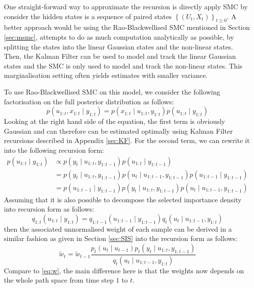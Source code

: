 One straight-forward way to approximate the recursion is directly apply SMC by consider the hidden states is a sequence of paired states $\left\{(U_t, X_t)\right\}_{t \geq 0}$. A better approach would be using the Rao-Blackwellised SMC mentioned in Section \ref{sec:msmc}, attempts to do as much computation analytically as possible, by splitting the states into the linear Gaussian states and the non-linear states. Then, the Kalman Filter can be used to model and track the linear Gaussian states and the SMC is only used to model and track the non-linear states. This marginalisation setting often yields estimates with smaller variance.

To use Rao-Blackwellised SMC on this model, we consider the following factorisation on the full posterior distribution as follows:
\begin{equation}
  p(u_{1:t}, x_{1:t} \mid y_{1:t}) = p(x_{1:t} \mid u_{1:t}, y_{1:t}) p(u_{1:t} \mid y_{1:t})
\end{equation}
Looking at the right hand side of the equation, the first term is obviously Gaussian and can therefore can be estimated optimally using Kalman Filter recursions described in Appendix \ref{sec:KF}. For the second term, we can rewrite it into the following recursion form:
\begin{align}
p(u_{1:t} \mid y_{1:t}) &\propto p(y_t \mid u_{1:t}, y_{1:t-1}) p(u_{1:t} \mid y_{1:t-1}) \nonumber \\
&=  p(y_t \mid u_{1:t}, y_{1:t-1}) p(u_t \mid u_{1:t-1}, y_{1:t-1}) p(u_{1:t-1} \mid y_{1:t-1}) \nonumber \\
&=  p(u_{1:t-1} \mid y_{1:t-1}) p(y_t \mid u_{1:t}, y_{1:t-1}) p(u_t \mid u_{1:t-1}, y_{1:t-1})
\label{eq:msmc}
\end{align}
Assuming that it is also possible to decompose the selected importance density into recursion form as follows:
\begin{equation}
        q_{1:t}(u_{1:t} \mid y_{1:t}) = q_{1:t-1}(u_{1:t-1} \mid y_{1:t-1}) q_t(u_t \mid u_{1:t-1}, y_{1:t})
\label{eq:q2}
\end{equation}
then the associated unnormalised weight of each sample can be derived in a similar fashion as given in Section \ref{sec:SIS} into the recursion form as follows:
\begin{equation}
   \tilde{w}_t  = \tilde{w}_{t-1} \dfrac{p_t(u_t \mid u_{t-1})p_t(y_t \mid u_{1:t}, y_{1:t-1})}{q_t(u_t \mid u_{1:t-1}, y_{1:t})}
   \label{eq:wsmsc}
\end{equation}
Compare to \eqref{eq:w}, the main difference here is that the weights now depends on the whole path space from time step $1$ to $t$.

